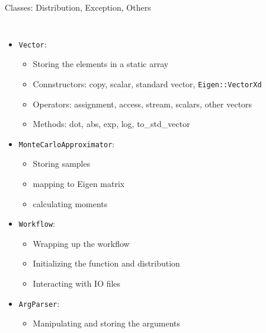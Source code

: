 \documentclass[8pt]{beamer}
\begin{document}
\begin{frame}{Classes: Distribution, Exception, Others}
\begin{columns}
{            \begin{itemize}
                \item \texttt{Vector}:
                \begin{itemize}
                    \item Storing the elements in a static array
                    \item Connstructors: copy, scalar, standard vector, \texttt{Eigen::VectorXd}
                    \item Operators: assignment, access, stream, scalars, other vectors
                    \item Methods: dot, abs, exp, log, to\_std\_vector
                \end{itemize}
                \item \texttt{MonteCarloApproximator}:
                \begin{itemize}
                    \item Storing samples
                    \item mapping to Eigen matrix
                    \item calculating moments
                \end{itemize}
                \item \texttt{Workflow}:
                \begin{itemize}
                    \item Wrapping up the workflow
                    \item Initializing the function and distribution
                    \item Interacting with IO files
                \end{itemize}
                \item \texttt{ArgParser}:
                \begin{itemize}
                    \item Manipulating and storing the arguments
                \end{itemize}
            \end{itemize}
        }
    \end{columns}
\end{frame}
\end{document}
